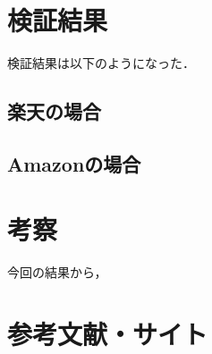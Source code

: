 \documentclass[dvipdfmx]{jsarticle}
\begin{document}
    \section{検証結果}
    検証結果は以下のようになった．
    \subsection{楽天の場合}

    \subsection{Amazonの場合}

    \section{考察}
    今回の結果から，
    \section{参考文献・サイト}
\end{document}
